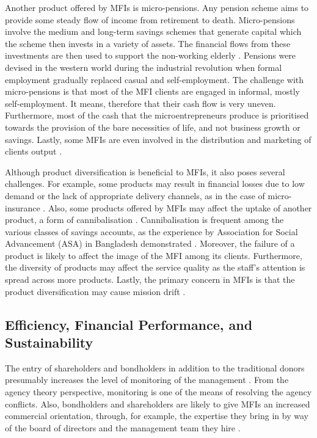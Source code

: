 \documentclass[a4paper, nobind]{templates/ociamthesis}
\begin{document}
Another product offered by MFIs is micro-pensions. Any pension scheme aims to provide some steady flow of income from retirement to death. Micro-pensions involve the medium and long-term savings schemes that generate capital which the scheme then invests in a variety of assets. The financial flows from these investments are then used to support the non-working elderly \autocite{churchill2012making}. Pensions were devised in the western world during the industrial revolution when formal employment gradually replaced casual and self-employment. The challenge with micro-pensions is that most of the MFI clients are engaged in informal, mostly self-employment. It means, therefore that their cash flow is very uneven. Furthermore, most of the cash that the microentrepreneurs produce is prioritised towards the provision of the bare necessities of life, and not business growth or savings. Lastly, some MFIs are even involved in the distribution and marketing of clients output \autocite{armendariz2010economics}.

Although product diversification is beneficial to MFIs, it also poses several challenges. For example, some products may result in financial losses due to low demand or the lack of appropriate delivery channels, as in the case of micro-insurance \autocite{platteau2017demand}. Also, some products offered by MFIs may affect the uptake of another product, a form of cannibalisation \autocite{elabed2015compound}. Cannibalisation is frequent among the various classes of savings accounts, as the experience by Association for Social Advancement (ASA) in Bangladesh demonstrated \autocite{campion1999institutional,meagher2006microfinance}. Moreover, the failure of a product is likely to affect the image of the MFI among its clients. Furthermore, the diversity of products may affect the service quality as the staff's attention is spread across more products. Lastly, the primary concern in MFIs is that the product diversification may cause mission drift \autocite{christen2001commercialization,chahine2010social}.

\hypertarget{efficiency-financial-performance-and-sustainability}{%
\subsection{Efficiency, Financial Performance, and Sustainability}\label{efficiency-financial-performance-and-sustainability}}

\noindent The entry of shareholders and bondholders in addition to the traditional donors presumably increases the level of monitoring of the management \autocite{stoughton1998ipo}. From the agency theory perspective, monitoring is one of the means of resolving the agency conflicts. Also, bondholders and shareholders are likely to give MFIs an increased commercial orientation, through, for example, the expertise they bring in by way of the board of directors and the management team they hire \autocite{lauer2008transforming}.
\end{document}
